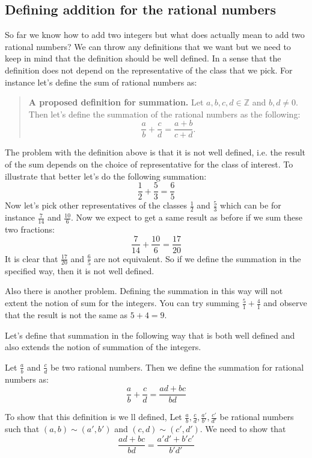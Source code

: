 \subsection{Defining addition for the rational numbers}
So far we know how to add two integers but what does actually mean to add two rational numbers? We can throw any definitions that we want but we need to keep in mind that the definition should be well defined. In a sense that the definition does not depend on the representative of the class that we pick. For instance let's define the sum of rational numbers as:

\begin{quote}
	\textbf{A proposed definition for summation.} Let $ a,b,c,d \in \mathbb{Z} $ and $ b,d \neq 0 $. Then let's define the summation of the rational numbers as the following:
	\[ \frac{a}{b} + \frac{c}{d} = \frac{a+b}{c+d}.  \]
\end{quote}

The problem with the definition above is that it is not well defined, i.e. the result of the sum depends on the choice of representative for the class of interest. To illustrate that better let's do the following summation:
\[ \frac{1}{2} + \frac{5}{3} = \frac{6}{5} \]
Now let's pick other representatives of the classes $ \frac{1}{2} $ and $ \frac{5}{3} $ which can be for instance $ \frac{7}{14} $ and $ \frac{10}{6} $. Now we expect to get a same result as before if we sum these two fractions:
\[ \frac{7}{14} + \frac{10}{6} = \frac{17}{20}  \]
It is clear that $ \frac{17}{20} $ and $ \frac{6}{5} $ are not equivalent. So if we define the summation in the specified way, then it is not well defined. 

Also there is another problem. Defining the summation in this way will not extent the notion of sum for the integers. You can try summing $ \frac{5}{1} + \frac{4}{1} $ and observe that the result is not the same as $ 5+4=9 $.

Let's define that summation in the following way that is both well defined and also extends the notion of summation of the integers. 

\begin{defbox}
	Let $ \frac{a}{b} $ and $ \frac{c}{d} $ be two rational numbers. Then we define the summation for rational numbers as:
	\[ \frac{a}{b} + \frac{c}{d} = \frac{ad + bc}{bd} \]
\end{defbox}

To show that this definition is we ll defined, Let $ \frac{a}{b},\frac{c}{d},\frac{a'}{b'},\frac{c'}{d'} $ be rational numbers such that $ (a,b) \sim (a',b') $ and $ (c,d) \sim (c', d') $. We need to show that
 \[ \frac{ad+bc}{bd} = \frac{a'd' + b'c'}{b'd'} \]
 
